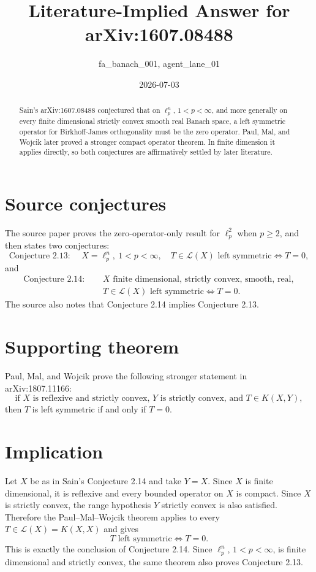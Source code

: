 \documentclass[11pt]{article}
\title{Literature-Implied Answer for arXiv:1607.08488}
\author{fa\_banach\_001, agent\_lane\_01}
\date{2026-07-03}
\begin{document}
\maketitle

\begin{abstract}
Sain's arXiv:1607.08488 conjectured that on \( \ell_p^n \), \(1<p<\infty\),
and more generally on every finite dimensional strictly convex smooth real
Banach space, a left symmetric operator for Birkhoff-James orthogonality must
be the zero operator. Paul, Mal, and Wojcik later proved a stronger compact
operator theorem. In finite dimension it applies directly, so both conjectures
are affirmatively settled by later literature.
\end{abstract}

\section*{Source conjectures}

The source paper proves the zero-operator-only result for \( \ell_p^2 \) when
\(p\geq 2\), and then states two conjectures:
\[
\text{Conjecture 2.13: }\quad
X=\ell_p^n,\ 1<p<\infty,\quad
T\in \mathcal L(X) \text{ left symmetric}
\iff T=0,
\]
and
\[
\begin{aligned}
\text{Conjecture 2.14: }&\quad
X \text{ finite dimensional, strictly convex, smooth, real},\\
&\quad T\in \mathcal L(X) \text{ left symmetric}\iff T=0.
\end{aligned}
\]
The source also notes that Conjecture 2.14 implies Conjecture 2.13.

\section*{Supporting theorem}

Paul, Mal, and Wojcik prove the following stronger statement in
arXiv:1807.11166:
\[
\text{if } X \text{ is reflexive and strictly convex, } Y \text{ is strictly
convex, and } T\in K(X,Y),
\]
then \(T\) is left symmetric if and only if \(T=0\).

\section*{Implication}

Let \(X\) be as in Sain's Conjecture 2.14 and take \(Y=X\). Since \(X\) is
finite dimensional, it is reflexive and every bounded operator on \(X\) is
compact. Since \(X\) is strictly convex, the range hypothesis \(Y\) strictly
convex is also satisfied. Therefore the Paul--Mal--Wojcik theorem applies to
every \(T\in\mathcal L(X)=K(X,X)\) and gives
\[
T \text{ left symmetric} \iff T=0.
\]
This is exactly the conclusion of Conjecture 2.14. Since
\(\ell_p^n\), \(1<p<\infty\), is finite dimensional and strictly convex, the
same theorem also proves Conjecture 2.13.
\end{document}
